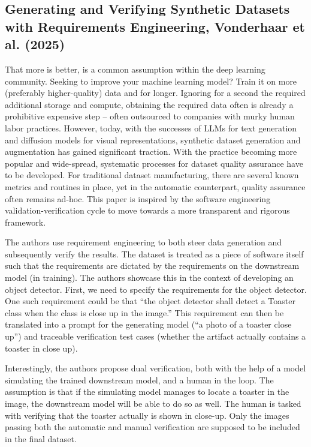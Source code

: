 \documentclass[a4paper, 11pt]{article}
\begin{document}
\subsection{Generating and Verifying Synthetic Datasets with Requirements Engineering, Vonderhaar et al. (2025)}
That more is better, is  a common assumption within the deep learning community. Seeking to improve your machine learning model? Train it on more (preferably higher-quality) data and for longer. Ignoring for a second the required additional storage and compute, obtaining the required data often is already a prohibitive expensive step – often outsourced to companies with murky human labor practices. However, today, with the successes of LLMs for text generation and diffusion models for visual representations, synthetic dataset generation and augmentation has gained significant traction. With the practice becoming more popular and wide-spread, systematic processes for dataset quality assurance have to be developed. For traditional dataset manufacturing, there are several known metrics and routines in place, yet in the automatic counterpart, quality assurance often remains ad-hoc. This paper is inspired by the software engineering validation-verification cycle to move towards a more transparent and rigorous framework. 

The authors use requirement engineering to both steer data generation and subsequently verify the results. The dataset is treated as a piece of software itself such that the requirements are dictated by the requirements on the downstream model (in training). The authors showcase this in the context of developing an object detector. First, we need to specify the requirements for the object detector. One such requirement could be that “the object detector shall detect a Toaster class when the class is close up in the image.” This requirement can then be translated into a prompt for the generating model (“a photo of a toaster close up”) and traceable verification test cases (whether the artifact actually contains a toaster in close up).

Interestingly, the authors propose dual verification, both with the help of a model simulating the trained downstream model, and a human in the loop. The assumption is that if the simulating model manages to locate a toaster in the image, the downstream model will be able to do so as well. The human is tasked with verifying that the toaster actually is shown in close-up. Only the images passing both the automatic and manual verification are supposed to be included in the final dataset. 
\end{document}
